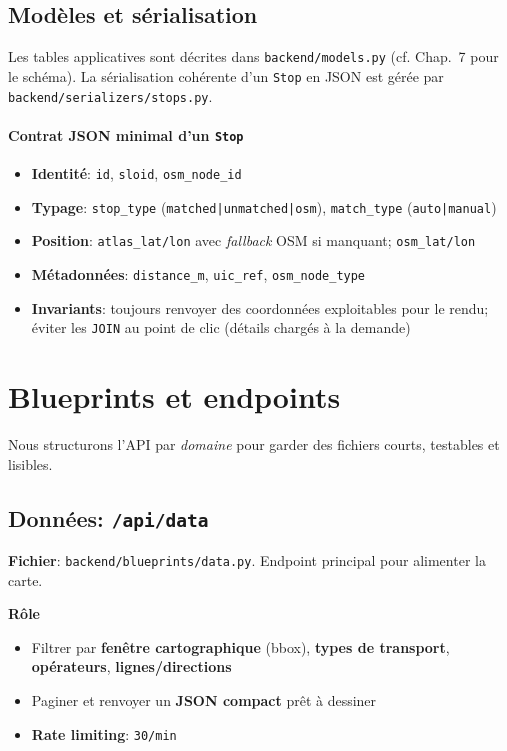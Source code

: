 \subsection*{Modèles et sérialisation}

Les tables applicatives sont décrites dans \texttt{backend/models.py} (cf. Chap.~7 pour le schéma). La sérialisation cohérente d'un \texttt{Stop} en JSON est gérée par \texttt{backend/serializers/stops.py}.

\paragraph{Contrat JSON minimal d'un \texttt{Stop}}
\begin{itemize}
  \item \textbf{Identité}: \texttt{id}, \texttt{sloid}, \texttt{osm\_node\_id}
  \item \textbf{Typage}: \texttt{stop\_type} (\texttt{matched|unmatched|osm}), \texttt{match\_type} (\texttt{auto|manual})
  \item \textbf{Position}: \texttt{atlas\_lat/lon} avec \textit{fallback} OSM si manquant; \texttt{osm\_lat/lon}
  \item \textbf{Métadonnées}: \texttt{distance\_m}, \texttt{uic\_ref}, \texttt{osm\_node\_type}
  \item \textbf{Invariants}: toujours renvoyer des coordonnées exploitables pour le rendu; éviter les \texttt{JOIN} au point de clic (détails chargés à la demande)
\end{itemize}

\section{Blueprints et endpoints}
Nous structurons l'API par \textit{domaine} pour garder des fichiers courts, testables et lisibles.

\subsection{Données: \texttt{/api/data}}

\textbf{Fichier}: \texttt{backend/blueprints/data.py}. Endpoint principal pour alimenter la carte.

\textbf{Rôle}
\begin{itemize}
  \item Filtrer par \textbf{fenêtre cartographique} (bbox), \textbf{types de transport}, \textbf{opérateurs}, \textbf{lignes/directions}
  \item Paginer et renvoyer un \textbf{JSON compact} prêt à dessiner
  \item \textbf{Rate limiting}: \texttt{30/min}
\end{itemize}

